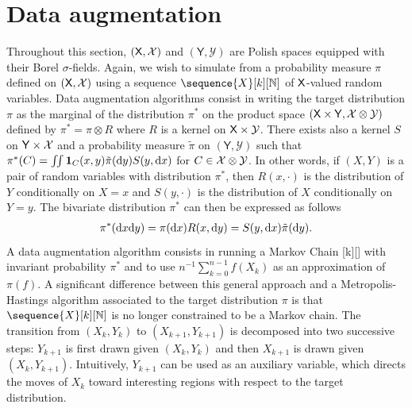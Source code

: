 \documentclass[english,graybox,envcountchap,envcountsame,sectrefs,shortlabels]{svmono}
\theoremstyle{style}
\newcommand{\Yset}{\mathsf{Y}}
\newcommand{\Ysigma}{\mathcal{Y}}
\newcommand{\eqsp}{}
\begin{document}
\section{Data augmentation}
Throughout this section, $(\mathsf{X},\mathcal{X})$ and $(\Yset,\Ysigma)$ are Polish spaces equipped with
their Borel $\sigma$-fields.  Again, we wish to simulate from a probability measure $\pi$ defined on
$(\mathsf{X},\mathcal{X})$ using a sequence $\sequence{X}[k][\nset]$ of $\mathsf{X}$-valued random variables. Data
augmentation algorithms consist in writing the target distribution $\pi$ as the marginal of the
distribution $\pi^*$ on the product space $(\Xset \times \Yset, \Xsigma\otimes\Ysigma)$ defined by
$\pi^* = \pi \otimes R$ where $R$ is a kernel on $\Xset \times \Ysigma$. There exists also a kernel $S$ on
$\Yset \times \Xsigma$ and a probability measure $\tilde \pi$ on $(\Yset,\Ysigma)$ such that
$\pi^*(C) = \iint \mathbf{1}_{C}(x,y)\tilde{\pi}(\mathrm{d} y) S(y,\mathrm{d} x)$ for $C \in \Xsigma \otimes \Ysigma$.
  In other words, if $(X,Y)$ is a pair of random variables with distribution $\pi^*$,
then $R(x,\cdot)$ is the distribution of $Y$ conditionally on $X=x$ and $S(y,\cdot)$ is the
distribution of $X$ conditionally on $Y=y$. The bivariate distribution $\pi^*$ can then be expressed
as follows
\begin{align}
  \pi^*(\rmd x\rmd y) = \pi(\rmd x) R(x,\rmd y) = S(y,\rmd x) \tilde\pi(\rmd y) \eqsp
  . \label{eq:pipipi}
\end{align}
A data augmentation algorithm consists in running a Markov Chain [k][\nset] with
invariant probability $\pi^*$ and to use $n^{-1} \sum_{k=0}^{n-1} f(X_k)$ as an approximation of
$\pi(f)$. A significant difference between this general approach and a Metropolis-Hastings algorithm
associated to the target distribution $\pi$ is that $\sequence{X}[k][\nset]$ is no longer
constrained to be a Markov chain.  The transition from $(X_k,Y_k)$ to $(X_{k+1},Y_{k+1})$ is
decomposed into two successive steps: $Y_{k+1}$ is first drawn given $(X_k,Y_k)$ and then $X_{k+1}$
is drawn given $(X_k,Y_{k+1})$. Intuitively, $Y_{k+1}$ can be used as an auxiliary variable, which directs
the moves of $X_k$ toward interesting regions with respect to the target distribution.
\end{document}
